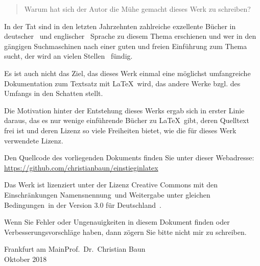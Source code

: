 \documentclass[a4paper,10pt,twoside]{scrbook}
\begin{document}
\begin{quote}
\glqq Warum hat sich der Autor die Mühe gemacht dieses Werk zu schreiben?\grqq
\end{quote}

In der Tat sind in den letzten Jahrzehnten zahlreiche exzellente Bücher in deutscher~\cite{Kopka2000,GoossensMittelachSamarin2000,voss2016einfuhrung} und englischer~\cite{mittelbach2004latex,kopka2003guide} Sprache zu diesem Thema erschienen und wer in den gängigen Suchmaschinen nach einer guten und freien Einführung zum Thema sucht, der wird an vielen Stellen~\cite{KrauseLink,JuergensFeuerstackLink,RichterTorstenLink,MarxBueckerLink,NagelLink,GitterLink} fündig.

Es ist auch nicht das Ziel, das dieses Werk einmal eine möglichst umfangreiche Dokumentation zum Textsatz mit \LaTeX\ wird, das andere Werke bzgl. des Umfangs in den Schatten stellt. 

Die Motivation hinter der Entstehung dieses Werks ergab sich in erster Linie daraus, das es nur wenige einführende Bücher zu \LaTeX\ gibt, deren Quelltext frei ist und deren Lizenz so viele Freiheiten bietet, wie die für dieses Werk verwendete Lizenz.

Den Quellcode des vorliegenden Dokuments finden Sie unter dieser Webadresse:\\
\url{https://github.com/christianbaun/einstieginlatex}

Das Werk ist lizenziert unter der Lizenz Creative Commons mit den Einschränkungen \glqq Namensnennung\grqq\ und \glqq Weitergabe unter gleichen Bedingungen\grqq\ in der Version 3.0 für Deutschland~\cite{CC-BY-SA-3.0License}.

Wenn Sie Fehler oder Ungenauigkeiten in diesem Dokument finden oder Verbesserungsvorschläge haben, dann zögern Sie bitte nicht mir zu schreiben. 

\begin{flushright} 
Frankfurt am Main\hfill Prof.~Dr.~Christian Baun\\
Oktober 2018
\end{flushright}

\mainmatter        %


\mainmatter









	

\end{document}
